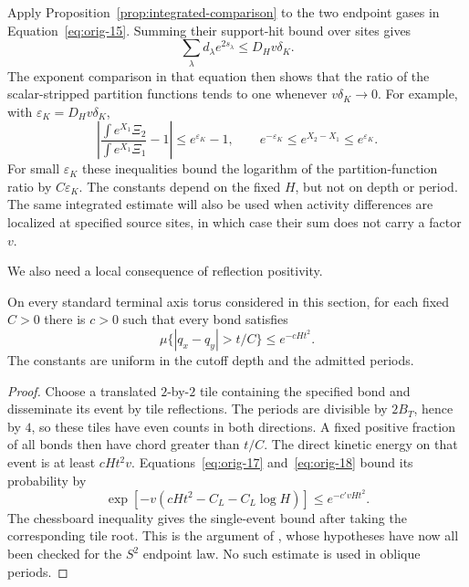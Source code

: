 Apply Proposition~\ref{prop:integrated-comparison} to the two endpoint
gases in Equation~\eqref{eq:orig-15}. Summing their support-hit bound
over sites gives
\[
 \sum_\lambda d_\lambda e^{2s_\lambda}\le D_Hv\delta_K.
\]
The exponent comparison in that equation then shows that the ratio
of the scalar-stripped partition functions tends to one whenever
$v\delta_K\to0$. For example, with $\varepsilon_K=D_Hv\delta_K$,
\[
 \left|\frac{\int e^{X_1}\Xi_2}{\int e^{X_1}\Xi_1}-1\right|
 \le e^{\varepsilon_K}-1,
 \qquad
 e^{-\varepsilon_K}\le e^{X_2-X_1}\le e^{\varepsilon_K}.
\]
For small $\varepsilon_K$ these inequalities bound the logarithm of
the partition-function ratio by $C\varepsilon_K$. The constants
depend on the fixed $H$, but not on depth or period. The same
integrated estimate will also be used when activity differences
are localized at specified source sites, in which case their sum
does not carry a factor $v$.

We also need a local consequence of reflection positivity.

\begin{corollary}
\label{cor:terminal-alignment}
On every standard terminal axis torus considered in this section,
for each fixed $C>0$ there is $c>0$ such that every bond satisfies
\begin{equation}
 \mu\{|q_x-q_y|>t/C\}\le e^{-cHt^2}.
 \label{eq:orig-23}
\end{equation}
The constants are uniform in the cutoff depth and the admitted periods.
\end{corollary}

\begin{proof}
Choose a translated $2$-by-$2$ tile containing the specified bond and
disseminate its event by tile reflections. The periods are divisible
by $2B_T$, hence by $4$, so these tiles have even counts in both
directions. A fixed positive fraction of all bonds then have chord
greater than $t/C$.
The direct kinetic energy on that event is at least $cHt^2v$.
Equations~\eqref{eq:orig-17} and~\eqref{eq:orig-18} bound its
probability by
\[
 \exp[-v(cHt^2-C_L-C_L\log H)]\le e^{-c'vHt^2}.
\]
The chessboard inequality gives the single-event bound after taking
the corresponding tile root. This is the argument of
, whose hypotheses have now all been checked for
the $S^2$ endpoint law. No such estimate is used in oblique periods.
\end{proof}
